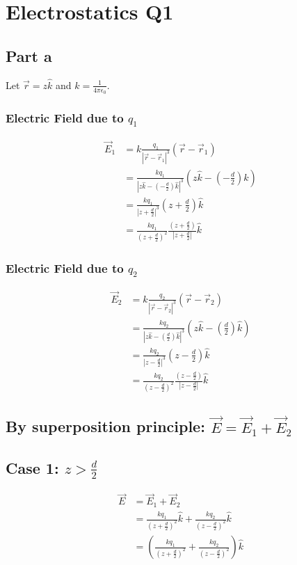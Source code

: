 \documentclass{article}
\begin{document}
\section*{Electrostatics Q1}

\subsection*{Part a}
Let $\vec{r} = z \hat{k}$ and $k = \frac{1}{4 \pi \epsilon_0}$.

\subsubsection*{Electric Field due to $q_1$}
\begin{align*}
\vec{E}_1 &= k \frac{q_1}{|\vec{r} - \vec{r}_1|^3} (\vec{r} - \vec{r}_1) \\
&= \frac{k q_1}{\left|z\hat{k} - (-\frac{d}{2})\hat{k}\right|^3} \left(z\hat{k} - (-\frac{d}{2})\hat{k}\right) \\
&= \frac{k q_1}{\left|z + \frac{d}{2}\right|^3} \left(z + \frac{d}{2}\right) \hat{k} \\
&= \frac{k q_1}{\left(z + \frac{d}{2}\right)^2} \frac{\left(z + \frac{d}{2}\right)}{\left|z + \frac{d}{2}\right|} \hat{k}
\end{align*}

\subsubsection*{Electric Field due to $q_2$}
\begin{align*}
\vec{E}_2 &= k \frac{q_2}{|\vec{r} - \vec{r}_2|^3} (\vec{r} - \vec{r}_2) \\
&= \frac{k q_2}{\left|z\hat{k} - (\frac{d}{2})\hat{k}\right|^3} \left(z\hat{k} - (\frac{d}{2})\hat{k}\right) \\
&= \frac{k q_2}{\left|z - \frac{d}{2}\right|^3} \left(z - \frac{d}{2}\right) \hat{k} \\
&= \frac{k q_2}{\left(z - \frac{d}{2}\right)^2} \frac{\left(z - \frac{d}{2}\right)}{\left|z - \frac{d}{2}\right|} \hat{k}
\end{align*}

\subsection*{By superposition principle: $\vec{E} = \vec{E}_1 + \vec{E}_2$}

\subsection*{Case 1: $z > \frac{d}{2}$}
\begin{align*}
\vec{E} &= \vec{E}_1 + \vec{E}_2 \\
&= \frac{k q_1}{\left(z + \frac{d}{2}\right)^2}  \hat{k} + \frac{k q_2}{\left(z - \frac{d}{2}\right)^2} \hat{k} \\
&= \left( \frac{k q_1}{\left(z + \frac{d}{2}\right)^2} + \frac{k q_2}{\left(z - \frac{d}{2}\right)^2} \right) \hat{k}
\end{align*}
\end{document}
